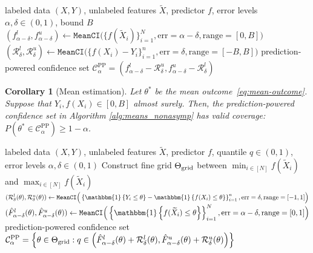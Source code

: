 \documentclass[10pt]{article}
\newtheorem{cor}{Corollary} %
\newcommand{\ind}[1]{\mathbbm{1}\left\{#1\right\}}
\newcommand{\cR}{\mathcal{R}}
\newcommand{\Xa}{X}
\newcommand{\Xt}{\widetilde{X}}
\newcommand{\Ya}{Y}
\newcommand{\CPP}{\mathcal{C}^{\mathrm{PP}}}
\begin{document}
\begin{algorithm}[H]
\caption{Prediction-powered mean estimation (nonasymptotic)}
\label{alg:means_nonasymp}
\begin{algorithmic}[1]
\Require labeled data $(\Xa, \Ya)$, unlabeled features $\Xt$, predictor $f$, error levels $\alpha,\delta\in(0,1)$, bound $B$
\State $( f^{l}_{\alpha-\delta},  f^{u}_{\alpha-\delta}) \leftarrow \texttt{MeanCI}\Big(\{f(\Xt_i)\}_{i=1}^N, \mathrm{err} = \alpha - \delta, \mathrm{range} = [0,B]\Big)$
\State $(\cR_\delta^l, \cR_\delta^u) \leftarrow \texttt{MeanCI}\Big(\{f(X_i) - Y_i\}_{i=1}^n, \mathrm{err} = \delta, \mathrm{range} = [-B,B] \Big)$
\Ensure 
prediction-powered confidence set $\CPP_\alpha = \left(f^{l}_{\alpha-\delta} - \cR_\delta^u, f^{u}_{\alpha-\delta} - \cR_\delta^l \right)$
\end{algorithmic}
\end{algorithm}

\begin{cor}[Mean estimation]
\label{cor:means_cor}
    Let $\theta^*$ be the mean outcome~\eqref{eq:mean-outcome}. Suppose that $Y_i,f(X_i)\in[0,B]$ almost surely. Then, the prediction-powered confidence set in Algorithm \ref{alg:means_nonasymp} has valid coverage: $P(\theta^* \in \CPP_\alpha)\geq 1-\alpha$.
\end{cor}






\begin{algorithm}[H]
\caption{Prediction-powered quantile estimation (nonasymptotic)}
\label{alg:quantile_nonasymp}
\begin{algorithmic}[1]
\Require labeled data $(\Xa, \Ya)$, unlabeled features $\Xt$, predictor $f$, quantile $q\in(0,1)$, error levels $\alpha,\delta\in(0,1)$
\State Construct fine grid $\Theta_{\rm grid}$ between $\min_{i\in[N]} f(\Xt_i)$ and $\max_{i\in[N]} f(\Xt_i)$ 
\State $(\cR_\delta^l(\theta), \cR_\delta^u(\theta)) \leftarrow \texttt{MeanCI}\Big(\left\{\ind{Y_i \leq \theta} - \ind{f(X_i) \leq \theta}\right\}_{i=1}^n, \mathrm{err} = \delta, \mathrm{range} = [-1,1]\Big)$
\State $(\hat F^l_{\alpha-\delta}(\theta), \hat F^u_{\alpha-\delta}(\theta))  \leftarrow \texttt{MeanCI} \Big(\left\{\ind{f(\Xt_i) \leq \theta} \right\}_{i=1}^N, \mathrm{err} = \alpha-\delta, \mathrm{range} = [0,1]\Big)$
\EndFor
\Ensure 
prediction-powered confidence set $\CPP_\alpha = \left\{ \theta \in \Theta_{\rm grid} : q \in \left(\hat F^l_{\alpha-\delta}(\theta) + \cR_\delta^l(\theta), \hat F^u_{\alpha-\delta}(\theta) + \cR_\delta^u(\theta) \right) \right\}$
\end{algorithmic}
\end{algorithm}
\end{document}

